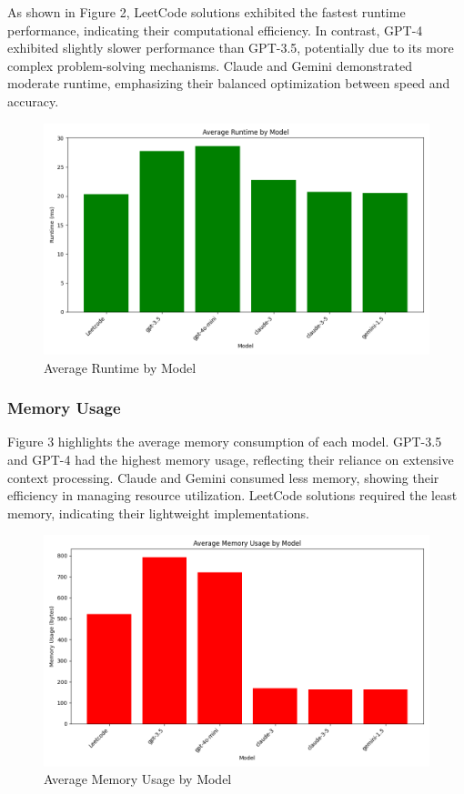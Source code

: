 As shown in Figure 2, LeetCode solutions exhibited the fastest runtime performance, indicating their computational efficiency. In contrast, GPT-4 exhibited slightly slower performance than GPT-3.5, potentially due to its more complex problem-solving mechanisms. Claude and Gemini demonstrated moderate runtime, emphasizing their balanced optimization between speed and accuracy.

\begin{figure}[H]
    \centering
    \includegraphics[width=15cm]{attachments/Average_Runtime.png}
    \caption{Average Runtime by Model} 
\end{figure}

\subsubsection{Memory Usage}

Figure 3 highlights the average memory consumption of each model. GPT-3.5 and GPT-4 had the highest memory usage, reflecting their reliance on extensive context processing. Claude and Gemini consumed less memory, showing their efficiency in managing resource utilization. LeetCode solutions required the least memory, indicating their lightweight implementations.

\begin{figure}[H]
    \centering
    \includegraphics[width=15cm]{attachments/Average_Memory_Usage.png}
    \caption{Average Memory Usage by Model} 
\end{figure}

